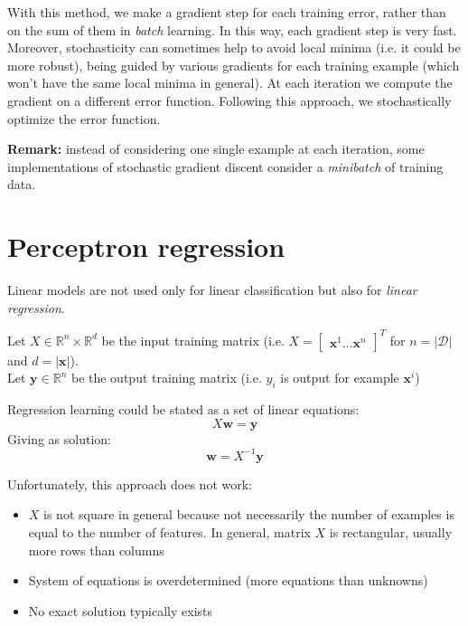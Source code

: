 With this method, we make a gradient step for each training error, rather than on
the sum of them in \textit{batch} learning. In this way, each gradient step is
very fast. Moreover, stochasticity can sometimes help to avoid local minima (i.e.
it could be more robust), being guided by various gradients for each training
example (which won't have the same local minima in general). At each iteration we
compute the gradient on a different error function. Following this approach, we stochastically
optimize the error function.
\newline

\textbf{Remark:} instead of considering one single example at each iteration, some
implementations of stochastic gradient discent consider a \textit{minibatch} of
training data.

\section{Perceptron regression}
Linear models are not used only for linear classification but also for \textit{linear
regression}.
\newline

Let $X \in \mathbb{R}^{n}\times \mathbb{R}^{d}$ be the input training matrix (i.e.
$X =
\begin{bmatrix}
	\pmb{x}^{1}\hdots \pmb{x}^{n}
\end{bmatrix}^{T}$ for $n=|\mathcal{D}|$ and $d=|\pmb{x}|$).\\ Let
$\pmb{y}\in \mathbb{R}^{n}$ be the output training matrix (i.e. $y_{i}$ is
output for example $\pmb{x}^{i}$)
\newline

Regression learning could be stated as a set of linear equations:
\begin{equation}
	X \pmb{w}= \pmb{y}
\end{equation}
Giving as solution:
\begin{equation}
	\pmb{w}= X^{-1}\pmb{y}
\end{equation}

Unfortunately, this approach does not work:

\begin{itemize}
	\item $X$ is not square in general because not necessarily the number of examples
		is equal to the number of features. In general, matrix $X$ is rectangular,
		usually more rows than columns

	\item System of equations is overdetermined (more equations than unknowns)

	\item No exact solution typically exists
\end{itemize}

